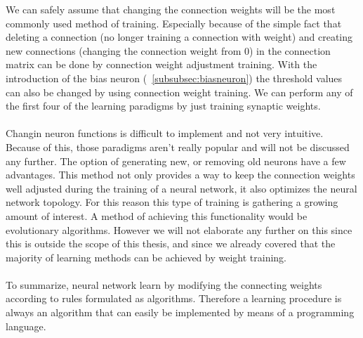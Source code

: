 \documentclass[pdftex,a4paper,12pt,twoside]{report}
\theoremstyle{plain} \newtheorem{theorem}{Theorem} \newtheorem{proposition}{Proposition} \newtheorem{lemma}{Lemma} \newtheorem*{corollary}{Corollary}
\theoremstyle{definition} \newtheorem{definition}{Definition} \newtheorem{conjecture}{Conjecture} \newtheorem*{example}{Example} \newtheorem{algorithm}{Algorithm}
\theoremstyle{remark} \newtheorem*{remark}{Remark} \newtheorem*{note}{Note} \newtheorem{case}{Case}
\begin{document}
We can safely assume that changing the connection weights will be the most commonly used method of training. Especially because of the simple fact that deleting a connection (no longer training a connection with weight) and creating new connections (changing the connection weight from 0) in the connection matrix can be done by connection weight adjustment training. With the introduction of the bias neuron (~\ref{subsubsec:biasneuron}) the threshold values can also be changed by using connection weight training.  We can perform any of the first four of the learning paradigms by just training synaptic weights.\\\\Changin neuron functions is difficult to implement and not very intuitive. Because of this, those paradigms aren't really popular and will not be discussed any further. The option of generating new, or removing old neurons have a few advantages. This method not only provides a way to keep the connection weights well adjusted during the training of a neural network, it also optimizes the neural network topology. For this reason this type of training is gathering a growing amount of interest. A method of achieving this functionality would be evolutionary algorithms. However we will not elaborate any further on this since this is outside the scope of this thesis, and since we already covered that the majority of learning methods can be achieved by weight training.\\\\To summarize, neural network learn by modifying the connecting weights according to rules formulated as algorithms. Therefore a learning procedure is always an algorithm that can easily be implemented by means of a programming language.
\end{document}
